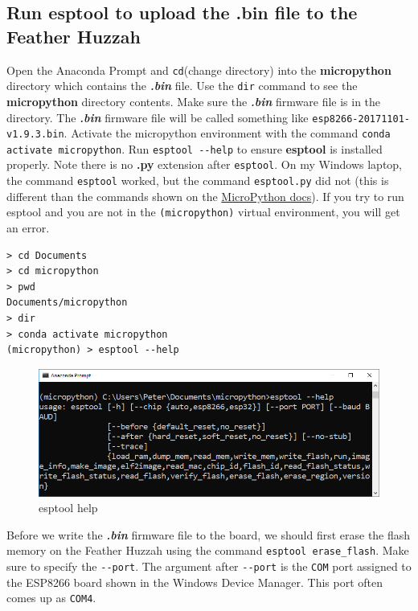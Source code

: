 \documentclass{book}
\makeatletter
\def\maxwidth{\ifdim\Gin@nat@width>\linewidth\linewidth
    \else\Gin@nat@width\fi}
\let\Oldincludegraphics\includegraphics
\renewcommand{\includegraphics}[1]{\Oldincludegraphics[width=.8\maxwidth]{#1}}
\makeatother
\begin{document}
    
        \subsection{Run esptool to upload the .bin file to the Feather
Huzzah}\label{run-esptool-to-upload-the-.bin-file-to-the-feather-huzzah}
    




    
        Open the Anaconda Prompt and \lstinline!cd!(change directory) into the
\textbf{micropython} directory which contains the \textbf{\emph{.bin}}
file. Use the \lstinline!dir! command to see the \textbf{micropython}
directory contents. Make sure the \textbf{\emph{.bin}} firmware file is
in the directory. The \textbf{\emph{.bin}} firmware file will be called
something like \lstinline!esp8266-20171101-v1.9.3.bin!. Activate the
micropython environment with the command
\lstinline!conda activate micropython!. Run \lstinline!esptool --help!
to ensure \textbf{esptool} is installed properly. Note there is no
\textbf{.py} extension after \lstinline!esptool!. On my Windows laptop,
the command \lstinline!esptool! worked, but the command
\lstinline!esptool.py! did not (this is different than the commands
shown on the
\href{https://docs.micropython.org/en/latest/esp8266/esp8266/tutorial/intro.html\#deploying-the-firmware}{MicroPython
docs}). If you try to run esptool and you are not in the
\lstinline!(micropython)! virtual environment, you will get an error.

\begin{lstlisting}
> cd Documents
> cd micropython
> pwd
Documents/micropython
> dir
> conda activate micropython
(micropython) > esptool --help
\end{lstlisting}

\begin{figure}
\centering
\includegraphics{images/esptool_help.PNG}
\caption{esptool help}
\end{figure}

Before we write the \textbf{\emph{.bin}} firmware file to the board, we
should first erase the flash memory on the Feather Huzzah using the
command \lstinline!esptool erase_flash!. Make sure to specify the
\lstinline!--port!. The argument after \lstinline!--port! is the
\lstinline!COM! port assigned to the ESP8266 board shown in the Windows
Device Manager. This port often comes up as \lstinline!COM4!.
\end{document}
